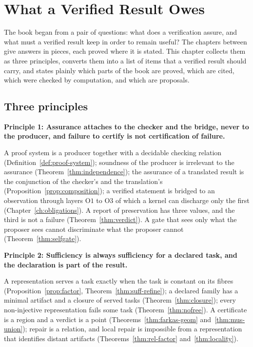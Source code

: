 \chapter{What a Verified Result Owes}
\label{ch:synthesis}

The book began from a pair of questions: what does a verification assure, and what must a verified result keep in order to remain useful? The chapters between give answers in pieces, each proved where it is stated. This chapter collects them as three principles, converts them into a list of items that a verified result should carry, and states plainly which parts of the book are proved, which are cited, which were checked by computation, and which are proposals.

\section{Three principles}

\begin{principal}
\textbf{Principle 1: Assurance attaches to the checker and the bridge, never to the producer, and failure to certify is not certification of failure.}

A proof system is a producer together with a decidable checking relation (Definition~\ref{def:proof-system}); soundness of the producer is irrelevant to the assurance (Theorem~\ref{thm:independence}); the assurance of a translated result is the conjunction of the checker's and the translation's (Proposition~\ref{prop:composition}); a verified statement is bridged to an observation through layers $\mathrm{O1}$ to $\mathrm{O3}$ of which a kernel can discharge only the first (Chapter~\ref{ch:obligations}). A report of preservation has three values, and the third is not a failure (Theorem~\ref{thm:verdict}). A gate that sees only what the proposer sees cannot discriminate what the proposer cannot (Theorem~\ref{thm:selfgate}).
\end{principal}

\begin{principal}
\textbf{Principle 2: Sufficiency is always sufficiency for a declared task, and the declaration is part of the result.}

A representation serves a task exactly when the task is constant on its fibres (Proposition~\ref{prop:factor}, Theorem~\ref{thm:suff-refine}); a declared family has a minimal artifact and a closure of served tasks (Theorem~\ref{thm:closure}); every non-injective representation fails some task (Theorem~\ref{thm:nofree}). A certificate is a region and a verdict is a point (Theorems~\ref{thm:farkas-geom} and~\ref{thm:mus-union}); repair is a relation, and local repair is impossible from a representation that identifies distant artifacts (Theorems~\ref{thm:rel-factor} and~\ref{thm:locality}).
\end{principal}

